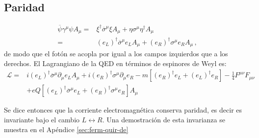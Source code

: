 \subsection{Paridad}
\begin{frame}
\begin{align}
  \overline{\psi}\gamma^{\mu}\psi A_{\mu}=&
\xi^{\dagger}\overline{\sigma}^{\mu}\xi A_{\mu}+\eta\sigma^{\mu}\eta^{\dagger} A_{\mu}\nonumber\\
=&(e_L)^{\dagger}\overline{\sigma}^{\mu}e_L A_{\mu}+(e_R)^{\dagger}\sigma^{\mu}e_{R} A_{\mu}\,,
\end{align}
de modo que el fotón se acopla por igual a los campos izquierdos que a los derechos. El Lagrangiano de la QED en términos de espinores de Weyl es:
\begin{align}
  \mathcal{L}=&i(e_L)^{\dagger}\overline{\sigma}^{\mu}\partial_{\mu}e_L A_{\mu}+i(e_R)^{\dagger}\sigma^{\mu}\partial_{\mu}e_{R}
-m \left[ \left( e_R \right)^\dagger e_L+\left( e_L \right)^{\dagger}e_R \right] -\tfrac{1}{4}F^{\mu\nu}F_{\mu\nu}\nonumber\\
   &+eQ \left[(e_L)^{\dagger}\overline{\sigma}^{\mu}e_L+(e_R)^{\dagger}\sigma^{\mu}e_{R}  \right] A_{\mu}
\end{align}
\end{frame}
Se dice entonces que la corriente  electromagnética conserva paridad, es decir es invariante bajo el cambio $L\leftrightarrow R$. 
Una demostración de esta invarianza se muestra en el Apéndice \ref{sec:ferm-quir-de}


